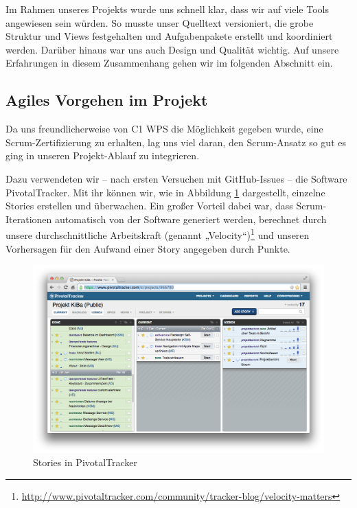 Im Rahmen unseres Projekts wurde uns schnell klar, dass wir auf viele Tools angewiesen sein würden. So musste unser Quelltext versioniert, die grobe Struktur und Views festgehalten und Aufgabenpakete erstellt und koordiniert werden. Darüber hinaus war uns auch Design und Qualität wichtig. Auf unsere Erfahrungen in diesem Zusammenhang gehen wir im folgenden Abschnitt ein.

\subsection{Agiles Vorgehen im Projekt}
	Da uns freundlicherweise von C1 WPS die Möglichkeit gegeben wurde, eine Scrum-Zertifizierung zu erhalten, lag uns viel daran, den Scrum-Ansatz so gut es ging in unseren Projekt-Ablauf zu integrieren.
	
	Dazu verwendeten wir – nach ersten Versuchen mit GitHub-Issues – die Software PivotalTracker. Mit ihr können wir, wie in Abbildung \ref{fig:TrackerStories} dargestellt, einzelne Stories erstellen und überwachen. Ein großer Vorteil dabei war, dass Scrum-Iterationen automatisch von der Software generiert werden, berechnet durch unsere durchschnittliche Arbeitskraft (genannt „Velocity“)\footnote{\url{http://www.pivotaltracker.com/community/tracker-blog/velocity-matters}} und unseren Vorhersagen für den Aufwand einer Story angegeben durch Punkte.
	
\begin{figure}[h!]
	\centering
	\includegraphics[scale=.25]{Pictures/TrackerStories}
	\vspace{-.8cm}
	\caption{Stories in PivotalTracker\label{fig:TrackerStories}}
\end{figure}

